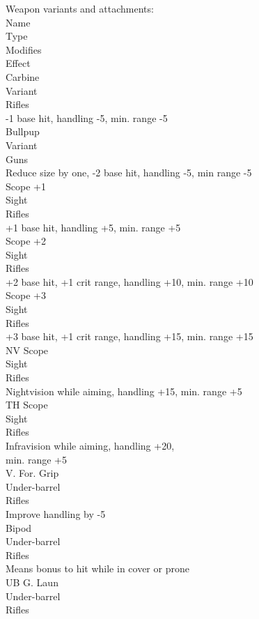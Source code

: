 \documentclass[letterpaper,titlepage,openany,twocolumn]{book}
\begin{document}
Weapon variants and attachments:\\
Name\\
Type\\
Modifies\\
Effect\\
Carbine\\
Variant\\
Rifles\\
-1 base hit, handling -5, min. range -5\\
Bullpup\\
Variant\\
Guns\\
Reduce size by one, -2 base hit, handling -5, min range -5\\
Scope +1\\
Sight\\
Rifles\\
+1 base hit, handling +5, min. range +5\\
Scope +2\\
Sight\\
Rifles\\
+2 base hit, +1 crit range, handling +10, min. range +10\\
Scope +3\\
Sight\\
Rifles\\
+3 base hit, +1 crit range, handling +15, min. range +15\\
NV Scope\\
Sight\\
Rifles\\
Nightvision while aiming, handling +15, min. range +5\\
TH Scope\\
Sight\\
Rifles\\
Infravision while aiming, handling +20,\\
min. range +5\\
V. For. Grip\\
Under-barrel\\
Rifles\\
Improve handling by -5\\
Bipod\\
Under-barrel\\
Rifles\\
Means bonus to hit while in cover or prone\\
UB G. Laun\\
Under-barrel\\
Rifles\\
\end{document}
